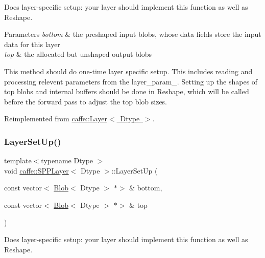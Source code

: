 Does layer-\/specific setup\+: your layer should implement this function as well as Reshape. 


\begin{DoxyParams}{Parameters}
{\em bottom} & the preshaped input blobs, whose data fields store the input data for this layer \\
\hline
{\em top} & the allocated but unshaped output blobs\\
\hline
\end{DoxyParams}
This method should do one-\/time layer specific setup. This includes reading and processing relevent parameters from the {\ttfamily layer\+\_\+param\+\_\+}. Setting up the shapes of top blobs and internal buffers should be done in {\ttfamily Reshape}, which will be called before the forward pass to adjust the top blob sizes. 

Reimplemented from \mbox{\hyperlink{classcaffe_1_1_layer_a481323a3e0972c682787f2137468c29f}{caffe\+::\+Layer$<$ Dtype $>$}}.

\mbox{\label{classcaffe_1_1_s_p_p_layer_a7241f9c4dfba841bc76a93298a3d28ee}} 
\subsubsection{\texorpdfstring{Layer\+Set\+Up()}{LayerSetUp()}\hspace{0.1cm}{\footnotesize\ttfamily [2/2]}}
{\footnotesize\ttfamily template$<$typename Dtype $>$ \\
void \mbox{\hyperlink{classcaffe_1_1_s_p_p_layer}{caffe\+::\+S\+P\+P\+Layer}}$<$ Dtype $>$\+::Layer\+Set\+Up (\begin{DoxyParamCaption}\item[{const vector$<$ \mbox{\hyperlink{classcaffe_1_1_blob}{Blob}}$<$ Dtype $>$ $\ast$$>$ \&}]{bottom,  }\item[{const vector$<$ \mbox{\hyperlink{classcaffe_1_1_blob}{Blob}}$<$ Dtype $>$ $\ast$$>$ \&}]{top }\end{DoxyParamCaption})\hspace{0.3cm}{\ttfamily [virtual]}}



Does layer-\/specific setup\+: your layer should implement this function as well as Reshape. 


